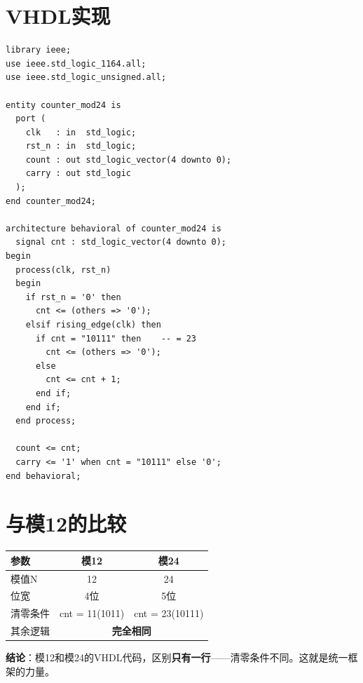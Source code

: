 \section{VHDL实现}

\begin{lstlisting}[caption={模24计数器}]
library ieee;
use ieee.std_logic_1164.all;
use ieee.std_logic_unsigned.all;

entity counter_mod24 is
  port (
    clk   : in  std_logic;
    rst_n : in  std_logic;
    count : out std_logic_vector(4 downto 0);
    carry : out std_logic
  );
end counter_mod24;

architecture behavioral of counter_mod24 is
  signal cnt : std_logic_vector(4 downto 0);
begin
  process(clk, rst_n)
  begin
    if rst_n = '0' then
      cnt <= (others => '0');
    elsif rising_edge(clk) then
      if cnt = "10111" then    -- = 23
        cnt <= (others => '0');
      else
        cnt <= cnt + 1;
      end if;
    end if;
  end process;

  count <= cnt;
  carry <= '1' when cnt = "10111" else '0';
end behavioral;
\end{lstlisting}

\section{与模12的比较}

\begin{center}
\begin{tabular}{|l|c|c|}
\hline
\textbf{参数} & \textbf{模12} & \textbf{模24} \\
\hline
模值N & 12 & 24 \\
位宽 & 4位 & 5位 \\
清零条件 & cnt = 11(1011) & cnt = 23(10111) \\
其余逻辑 & \multicolumn{2}{c|}{\textbf{完全相同}} \\
\hline
\end{tabular}
\end{center}

\textbf{结论}：模12和模24的VHDL代码，区别\textbf{只有一行}——清零条件不同。这就是统一框架的力量。
